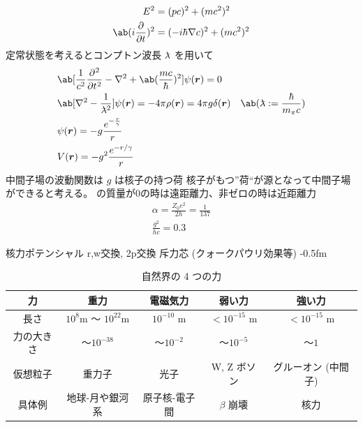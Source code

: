 \documentclass[uplatex,dvipdfmx,a4paper,11pt]{jlreq}
\newcommand{\rr}{\bm{r}}
\newcommand{\lbar}{\lambda \kern -0.5em\raise 0.5ex \hbox{--}}
\numberwithin{equation}{section}
\theoremstyle{definition}
\begin{document}
\begin{align}
  E^2                 & = (pc)^2 + (mc^2)^2              \\
  \ab(i\diffp{}{t})^2 & = (-i\hbar\nabla c)^2 + (mc^2)^2
\end{align}
定常状態を考えるとコンプトン波長 $\lbar$ を用いて
\begin{align}
   & \ab[\frac{1}{c^2}\diffp[2]{}{t} - \nabla^2 + \ab(\frac{mc}{\hbar})^2]\psi(\rr) = 0                                       \\
   & \ab[\nabla^2 - \frac{1}{\lbar^2}]\psi(\rr) = -4\pi\rho(\rr) = 4\pi g\delta(\rr)    & \ab(\lbar := \frac{\hbar}{m_\pi c}) \\
   & \psi(\rr) = -g\frac{e^{-\frac{r}{\gamma}}}{r}                                                                            \\
   & V(\rr) = -g^2\frac{e^{-r/\gamma}}{r}
\end{align}
中間子場の波動関数は $g$ は核子の持つ荷
核⼦がもつ”荷“が源となって中間⼦場ができると考える。
の質量が0の時は遠距離⼒、⾮ゼロの時は近距離⼒
\begin{align}
  \alpha = \frac{Z_0 e^2}{2h} = \frac{1}{137} \\
  \frac{g^2}{hc} = 0.3
\end{align}

核⼒ポテンシャル
r,w交換, 2p交換
斥力芯 (クォークパウリ効果等) -0.5fm

\begin{table}[hbtp]
  \centering
  \begin{tabular}{|c|c|c|c|c|}
    \hline
    力     & 重力                             & 電磁気力              & 弱い力                & 強い力                \\
    \hline \hline
    長さ    & $10^8$\si{m} ～ $10^{22}$\si{m} & $10^{-10}$ \si{m} & $<10^{-15}$ \si{m} & $<10^{-15}$ \si{m} \\
    力の大きさ & ～$10^{-38}$                    & ～$10^{-2}$        & ～$10^{-5}$         & ～$1$               \\
    仮想粒子  & 重力子                            & 光子                & W, Z ボソン           & グルーオン (中間子)        \\
    具体例   & 地球-月や銀河系                       & 原子核-電子間           & $\beta$ 崩壊         & 核力                 \\
    \hline
  \end{tabular}
  \caption{自然界の 4 つの力}
  \label{table:force}
\end{table}
\end{document}
